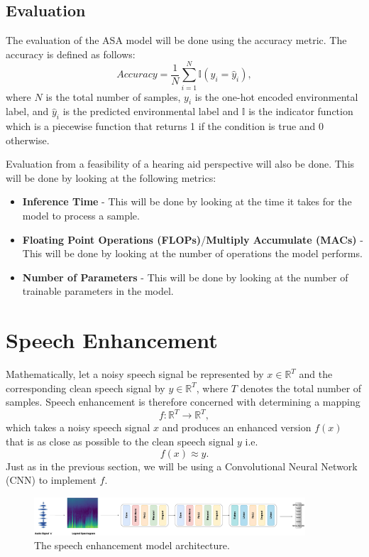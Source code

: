\documentclass[logo,bsc,singlespacing,parskip,online]{infthesis}
\begin{document}
\subsection{Evaluation}
The evaluation of the ASA model will be done using the accuracy metric. The accuracy is defined as follows:
\[
Accuracy = \frac{1}{N} \sum_{i=1}^{N} \mathbb{I}(y_i = \hat{y}_i),
\]
where \(N\) is the total number of samples, \(y_i\) is the one-hot encoded environmental label, and \(\hat{y}_i\) is the predicted environmental label
and \(\mathbb{I}\) is the indicator function which is a piecewise function that returns 1 if the condition is true and 0 otherwise.

Evaluation from a feasibility of a hearing aid perspective will also be done. 
This will be done by looking at the following metrics:
\begin{itemize}
   \item \textbf{Inference Time} - This will be done by looking at the time it takes for the model to process a sample.
   \item \textbf{Floating Point Operations (FLOPs)}/\textbf{Multiply Accumulate (MACs)} - This will be done by looking at the number of operations the model performs.
   \item \textbf{Number of Parameters} - This will be done by looking at the number of trainable parameters in the model.
\end{itemize}

\section{Speech Enhancement}
\label{sec:methodology-se}
Mathematically, let a noisy speech signal be represented by \(x \in \mathbb{R}^{T}\) and the corresponding clean speech signal by \(y \in \mathbb{R}^{T}\), where \(T\) denotes the total number of samples.
Speech enhancement is therefore concerned with determining a mapping 
\[
f: \mathbb{R}^{T} \to \mathbb{R}^{T},
\]
which takes a noisy speech signal \(x\) and produces an enhanced version \(f(x)\) that is as close as possible to the clean speech signal \(y\) i.e.
\[
f(x) \approx y.
\]
Just as in the previous section, we will be using a Convolutional Neural Network (CNN) to implement \(f\).
\begin{figure}[h]
   \centering
   \includegraphics[width=0.9\textwidth]{se-model-diagram.png}
   \caption{The speech enhancement model architecture.}
   \label{fig:speech-enhancement-model-architecture}
\end{figure}
\end{document}
